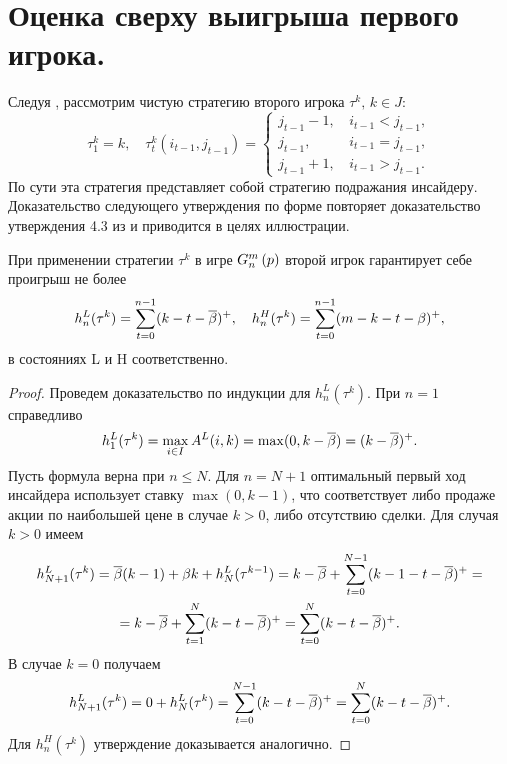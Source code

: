 {\section{Оценка сверху выигрыша первого игрока.}\label{ch1:upper-bound}
Следуя \cite{domansky07}, рассмотрим чистую стратегию второго игрока $\tau^k, \,
k \in J$:
\[
  \tau^k_1 = k, \quad \tau^k_t(i_{t-1}, j_{t-1}) = \begin{cases}
    j_{t-1} - 1, & \, i_{t-1} < j_{t-1}, \\
    j_{t-1},     & \, i_{t-1} = j_{t-1}, \\
    j_{t-1} + 1, & \, i_{t-1} > j_{t-1}.
  \end{cases}
\]
По сути эта стратегия представляет собой стратегию подражания инсайдеру.
Доказательство следующего утверждения по форме повторяет доказательство
утверждения 4.3 из \cite{domansky07} и приводится в целях иллюстрации.

\begin{proposition}
  \label{ch1:prop:secondPlayerStrategyPayoffs}
  При применении стратегии $\tau^k$ в игре $G_{n}^m\left({p}\right)$ второй игрок
  гарантирует себе проигрыш не более
  \[
    h_n^L(\tau^k) = \sum_{t=0}^{n-1}(k - t - {\overline{\beta}})^+, \quad h_n^H(\tau^k) =
    \sum_{t=0}^{n-1}(m - k - t - \beta)^+,
  \]
  в состояниях L и H соответственно.
\end{proposition}
\begin{proof}
  Проведем доказательство по индукции для $h^L_n(\tau^k)$. При $n=1$ справедливо
  \[
    h^L_1(\tau^k) = \max_{i \in I} A^L(i, k) = \max(0, k - {\overline{\beta}}) = (k - {\overline{\beta}})^+.
  \]
  Пусть формула верна при $n \leq N$. Для $n=N+1$ оптимальный первый ход
  инсайдера использует ставку $\max(0, k - 1)$, что соответствует либо продаже
  акции по наибольшей цене в случае $k > 0$, либо отсутствию сделки. Для случая
  $k > 0$ имеем
  \begin{gather*}
    h^L_{N+1}(\tau^k) = {\overline{\beta}} (k-1) + \beta k + h^L_N(\tau^{k-1}) =
    k - {\overline{\beta}} + \sum_{t=0}^{N-1}(k - 1 - t - {\overline{\beta}})^+ = \\
    = k - {\overline{\beta}} + \sum_{t=1}^N(k-t-{\overline{\beta}})^+ = \sum_{t=0}^N(k-t-{\overline{\beta}})^+.
  \end{gather*}
  В случае $k = 0$ получаем
  \begin{gather*}
    h^L_{N+1}(\tau^k) = 0 + h^L_N(\tau^k) = \sum_{t=0}^{N-1}(k-t-{\overline{\beta}})^+ = \sum_{t=0}^N(k-t-{\overline{\beta}})^+.
  \end{gather*}
  Для $h^H_n(\tau^k)$ утверждение доказывается аналогично.
\end{proof}

}
